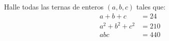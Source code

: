 Halle todas las ternas de enteros $(a,b,c)$ tales que:
\begin{align*}
a+b+c&=24\\
a^2+b^2+c^2&=210\\
abc&=440
\end{align*}
